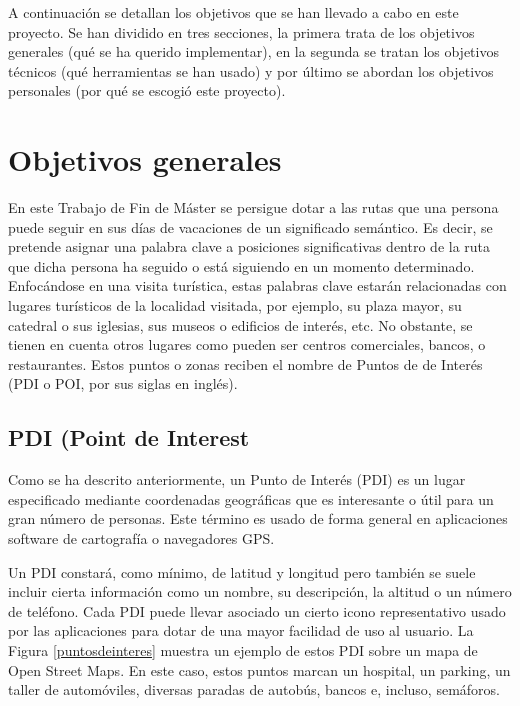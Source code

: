 
A continuación se detallan los objetivos que se han llevado a cabo en este proyecto. Se han dividido
en tres secciones, la primera trata de los objetivos generales (qué se ha querido implementar), en
la segunda se tratan los objetivos técnicos (qué herramientas se han usado) y por último se abordan
los objetivos personales (por qué se escogió este proyecto).

\section{Objetivos generales}

En este Trabajo de Fin de Máster se persigue dotar a las rutas que una persona puede seguir en sus días de vacaciones de un significado semántico. Es decir, se pretende asignar una palabra clave a posiciones significativas dentro de la ruta que dicha persona ha seguido o está siguiendo en un momento determinado. Enfocándose en una visita turística, estas palabras clave estarán relacionadas con lugares turísticos de la localidad visitada, por ejemplo, su plaza mayor, su catedral o sus iglesias, sus museos o edificios de interés, etc. No obstante, se tienen en cuenta otros lugares como pueden ser centros comerciales, bancos, o restaurantes. Estos puntos o zonas reciben el nombre de Puntos de de Interés (PDI o POI, por sus siglas en inglés).

\subsection{PDI (Point de Interest}
Como se ha descrito anteriormente, un Punto de Interés (PDI) es un lugar especificado mediante coordenadas geográficas que es interesante o útil para un gran número de personas. Este término es usado de forma general en aplicaciones software de cartografía o navegadores GPS.

Un PDI constará, como mínimo, de latitud y longitud pero también se suele incluir cierta información como un nombre, su descripción, la altitud o un número de teléfono. Cada PDI puede llevar asociado un cierto icono representativo usado por las aplicaciones para dotar de una mayor facilidad de uso al usuario. La Figura \ref{puntosdeinteres} muestra un ejemplo de estos PDI sobre un mapa de Open Street Maps. En este caso, estos puntos marcan un hospital, un parking, un taller de automóviles, diversas paradas de autobús, bancos e, incluso, semáforos.

